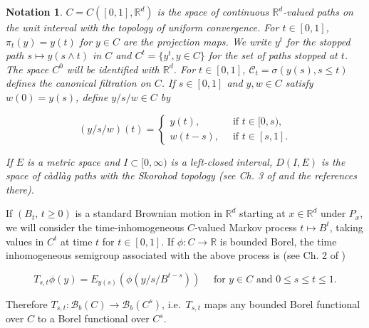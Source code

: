 \documentclass[12pt]{article}
\numberwithin{theorem}{section}
\theoremstyle{def}
\newtheorem*{notation}{Notation}
\numberwithin{equation}{section}
\newcommand{\R}{\mathbb{R}}
\newcommand{\cC}{\mathcal C}
\newcommand{\SUBMIT}[1]{}
\newcommand{\ARXIV}[1]{#1}
\begin{document}
\begin{notation} $C=C([0,1],\R^d)$ is the space of continuous $\R^d$-valued paths on the unit interval with the topology of uniform convergence. For $t\in[0,1]$,   $\pi_t(y)=y(t)$ for $y\in C$ are the projection maps. 
We write $y^t$ for the stopped path $s\mapsto y(s\wedge t)$ in $C$ and $C^t=\{y^t,y\in C\}$ for the set of paths stopped at $t$. 
The space $C^0$ will be identified with $\R^d$. 
For $t\in[0,1]$, $\cC_t=\sigma(y(s),s\le t)$ defines the canonical filtration on $C$.  If $s\in [0,1]$ and $y,w\in C$ satisfy $w(0)=y(s)$, define $y/s/w\in C$ by 
\ARXIV{
\begin{equation}\label{eq:definition concatenation paths}
(y/s/w)(t)=\begin{cases} y(t),\ &\text{ if }t\in[0,s),\\
w(t-s), \ &\text{ if }t\in[s,1].
\end{cases}
\end{equation}}
\SUBMIT{
\begin{equation*}
		(y/s/w)(t)=\begin{cases} y(t),\ &\text{ if }t\in[0,s),\\
			w(t-s), \ &\text{ if }t\in[s,1].
		\end{cases}
\end{equation*}}
If $E$ is a metric space and $I\subset [0,\infty)$ is a left-closed interval, $D(I,E)$ is the space of c\`adl\`ag paths with the Skorohod topology (see Ch. 3 of \cite{EK} and the references there). 
\end{notation}


If $(B_t, \, t\ge 0)$ is a standard Brownian motion in $\R^d$ starting at $x\in \R^d$ under $P_x$, we will consider the time-inhomogeneous $C$-valued Markov process $t\mapsto B^t$, taking values in $C^t$ at time $t$ for $t\in[0,1]$. 
If $\phi:C\to\R$ is bounded Borel, the time inhomogeneous semigroup associated with the above process is (see Ch. 2 of \cite{DP91}) 
\ARXIV{
\begin{equation}
	\label{eq:def semi group HBM}
T_{s,t}\phi(y)=E_{y(s)}(\phi(y/s/B^{t-s}))\quad \text{ for }y\in C\text{ and }0\le s\le t\le 1.
\end{equation}}
\SUBMIT{
\begin{equation*}
	T_{s,t}\phi(y)=E_{y(s)}(\phi(y/s/B^{t-s}))\quad \text{ for }y\in C\text{ and }0\le s\le t\le 1.
\end{equation*}
}
Therefore $T_{s,t}:\mathcal{B}_b(C)\to \mathcal{B}_b(C^s)$, i.e.\ $T_{s,t}$ maps any bounded Borel functional over $C$ to a Borel functional over $C^s$.
\end{document}

